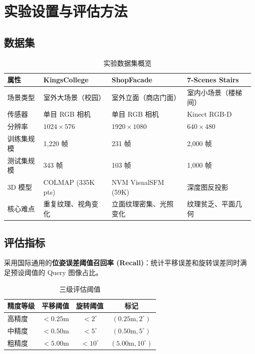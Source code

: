 \documentclass[12pt,a4paper]{ctexart}
\begin{document}
\section{实验设置与评估方法}

\subsection{数据集}

\begin{table}[H]
\centering
\caption{实验数据集概览}
\label{tab:datasets}
\small
\begin{tabularx}{\textwidth}{@{}p{2.6cm}XXX@{}}
\toprule
\textbf{属性} & \textbf{KingsCollege} & \textbf{ShopFacade} & \textbf{7-Scenes Stairs} \\
\midrule
场景类型 & 室外大场景（校园） & 室外立面（商店门面） & 室内小场景（楼梯间） \\
传感器 & 单目 RGB 相机 & 单目 RGB 相机 & Kinect RGB-D \\
分辨率 & $1024\times576$ & $1920\times1080$ & $640\times480$ \\
训练集规模 & 1,220 帧 & 231 帧 & 2,000 帧 \\
测试集规模 & 343 帧 & 103 帧 & 1,000 帧 \\
3D 模型 & COLMAP (335K pts) & NVM VisualSFM (59K) & 深度图反投影 \\
核心难点 & 重复纹理、视角变化 & 立面纹理密集、光照变化 & 纹理贫乏、平面几何 \\
\bottomrule
\end{tabularx}
\end{table}

\subsection{评估指标}

采用国际通用的\textbf{位姿误差阈值召回率 (Recall)}：统计平移误差和旋转误差同时满足预设阈值的
Query 图像占比。

\begin{table}[H]
\centering
\caption{三级评估阈值}
\label{tab:thresholds}
\begin{tabular}{@{}lccc@{}}
\toprule
\textbf{精度等级} & \textbf{平移阈值} & \textbf{旋转阈值} & \textbf{标记} \\
\midrule
高精度 & $< 0.25$m & $< 2^\circ$ & $(0.25\text{m}, 2^\circ)$ \\
中精度 & $< 0.50$m & $< 5^\circ$ & $(0.50\text{m}, 5^\circ)$ \\
粗精度 & $< 5.00$m & $< 10^\circ$ & $(5.00\text{m}, 10^\circ)$ \\
\bottomrule
\end{tabular}
\end{table}
\end{document}
